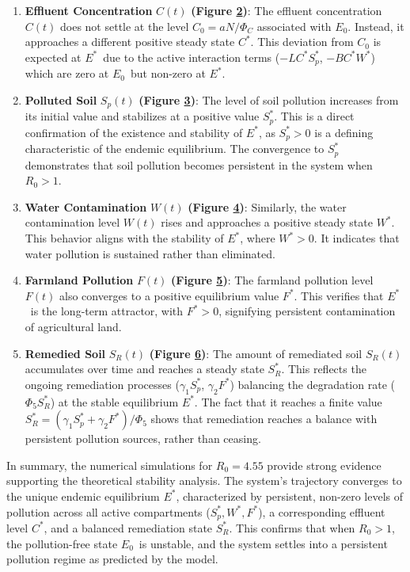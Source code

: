 \documentclass[10pt]{NSP1}
\begin{document}
\begin{enumerate}
\def\labelenumi{\arabic{enumi}.}
\item
  \textbf{Effluent Concentration} \(C(t)\) \textbf{(Figure \hyperref[2xcytpi]{2})}: The effluent concentration \(C(t)\) does not settle at the level \(C_{0} = aN/\Phi_{C}\) associated with \(E_{0}\). Instead, it approaches a different positive steady state \(C^{*}\). This deviation from \(C_{0}\) is expected at \(E^{*}\)~due to the active interaction terms (\(- LC^{*}S_{p}^{*}\), \(- BC^{*}W^{*}\)) which are zero at \(E_{0}\)~but non-zero at \(E^{*}\).
\item
  \textbf{Polluted Soil} \(S_{p}(t)\) \textbf{(Figure \hyperref[1ci93xb]{3})}: The level of soil pollution increases from its initial value and stabilizes at a positive value \(S_{p}^{*}\). This is a direct confirmation of the existence and stability of \(E^{*}\), as \(S_{p}^{*} > 0\) is a defining characteristic of the endemic equilibrium. The convergence to \(S_{p}^{*}\) demonstrates that soil pollution becomes persistent in the system when \(R_{0} > 1\).
\item
  \textbf{Water Contamination} \(W(t)\) \textbf{(Figure \hyperref[3whwml4]{4})}: Similarly, the water contamination level \(W(t)\) rises and approaches a positive steady state \(W^{*}\). This behavior aligns with the stability of \(E^{*}\), where \(W^{*} > 0\). It indicates that water pollution is sustained rather than eliminated.
\item
  \textbf{Farmland Pollution} \(F(t)\) \textbf{(Figure \hyperref[qsh70q]{5})}: The farmland pollution level \(F(t)\) also converges to a positive equilibrium value \(F^{*}\). This verifies that \(E^{*}\)~is the long-term attractor, with \(F^{*} > 0\), signifying persistent contamination of agricultural land.
\item
  \textbf{Remedied Soil} \(S_{R}(t)\) \textbf{(Figure \hyperref[3as4poj]{6})}: The amount of remediated soil \(S_{R}(t)\) accumulates over time and reaches a steady state \(S_{R}^{*}\). This reflects the ongoing remediation processes (\(\gamma_{1}S_{p}^{*}\), \(\gamma_{2}F^{*}\)) balancing the degradation rate (\(\Phi_{5}S_{R}^{*}\)) at the stable equilibrium \(E^{*}\). The fact that it reaches a finite value \(S_{R}^{*} = \left( \gamma_{1}S_{p}^{*} + \gamma_{2}F^{*} \right)/\Phi_{5}\) shows that remediation reaches a balance with persistent pollution sources, rather than ceasing.
\end{enumerate}

In summary, the numerical simulations for \(R_{0} = 4.55\) provide strong evidence supporting the theoretical stability analysis. The system's trajectory converges to the unique endemic equilibrium \(E^{*}\), characterized by persistent, non-zero levels of pollution across all active compartments (\(S_{p}^{*},W^{*},F^{*}\)), a corresponding effluent level \(C^{*}\), and a balanced remediation state \(S_{R}^{*}\). This confirms that when \(R_{0} > 1\), the pollution-free state \(E_{0}\)~is unstable, and the system settles into a persistent pollution regime as predicted by the model.
\end{document}
